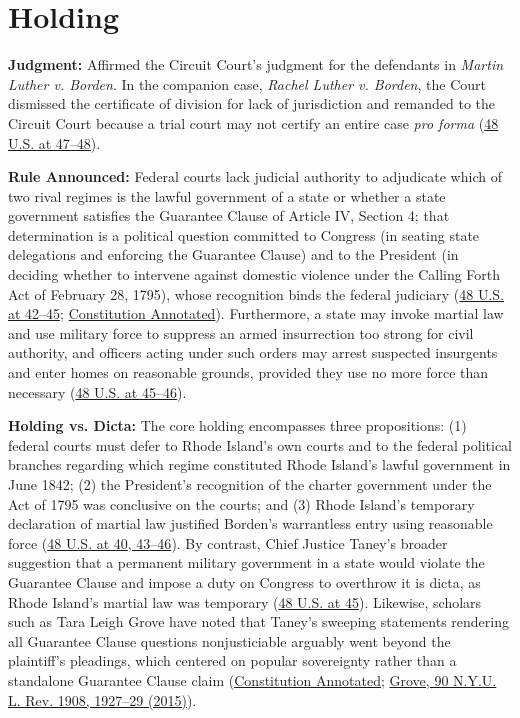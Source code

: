\documentclass[12pt]{article}
\begin{document}
\section{Holding}

\textbf{Judgment:} Affirmed the Circuit Court's judgment for the defendants in \textit{Martin Luther v. Borden}. In the companion case, \textit{Rachel Luther v. Borden}, the Court dismissed the certificate of division for lack of jurisdiction and remanded to the Circuit Court because a trial court may not certify an entire case \textit{pro forma} (\href{https://supreme.justia.com/cases/federal/us/48/1/}{48 U.S. at 47--48}).

\textbf{Rule Announced:} Federal courts lack judicial authority to adjudicate which of two rival regimes is the lawful government of a state or whether a state government satisfies the Guarantee Clause of Article IV, Section 4; that determination is a political question committed to Congress (in seating state delegations and enforcing the Guarantee Clause) and to the President (in deciding whether to intervene against domestic violence under the Calling Forth Act of February 28, 1795), whose recognition binds the federal judiciary (\href{https://supreme.justia.com/cases/federal/us/48/1/}{48 U.S. at 42--45}; \href{https://www.law.cornell.edu/constitution-conan/article-3/section-2/clause-1/luther-v-borden-and-the-guarantee-clause}{Constitution Annotated}). Furthermore, a state may invoke martial law and use military force to suppress an armed insurrection too strong for civil authority, and officers acting under such orders may arrest suspected insurgents and enter homes on reasonable grounds, provided they use no more force than necessary (\href{https://supreme.justia.com/cases/federal/us/48/1/}{48 U.S. at 45--46}).

\textbf{Holding vs. Dicta:} The core holding encompasses three propositions: (1) federal courts must defer to Rhode Island's own courts and to the federal political branches regarding which regime constituted Rhode Island's lawful government in June 1842; (2) the President's recognition of the charter government under the Act of 1795 was conclusive on the courts; and (3) Rhode Island's temporary declaration of martial law justified Borden's warrantless entry using reasonable force (\href{https://supreme.justia.com/cases/federal/us/48/1/}{48 U.S. at 40, 43--46}). By contrast, Chief Justice Taney's broader suggestion that a permanent military government in a state would violate the Guarantee Clause and impose a duty on Congress to overthrow it is dicta, as Rhode Island's martial law was temporary (\href{https://supreme.justia.com/cases/federal/us/48/1/}{48 U.S. at 45}). Likewise, scholars such as Tara Leigh Grove have noted that Taney's sweeping statements rendering all Guarantee Clause questions nonjusticiable arguably went beyond the plaintiff's pleadings, which centered on popular sovereignty rather than a standalone Guarantee Clause claim (\href{https://www.law.cornell.edu/constitution-conan/article-3/section-2/clause-1/luther-v-borden-and-the-guarantee-clause}{Constitution Annotated}; \href{https://scholarship.law.wm.edu/cgi/viewcontent.cgi?article=2834&context=facpubs}{Grove, 90 N.Y.U. L. Rev. 1908, 1927--29 (2015)}).
\end{document}
